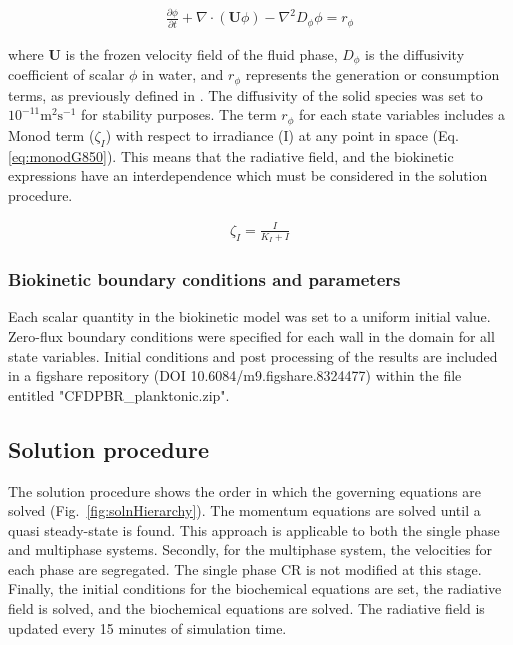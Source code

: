 \begin{align}
\frac{\partial \phi}{\partial t} + \nabla \cdot \left( \mathbf{U}\phi \right) - \nabla^2 D_\phi \phi = r_{\phi}
\end{align}

\noindent where $\mathbf{U}$ is the frozen velocity field of the fluid phase, ${D}_{\phi}$ is the diffusivity coefficient of scalar $\phi$ in water, and $r_{\phi}$ represents the generation or consumption terms, as previously defined in \cite{puyol2017}. The diffusivity of the solid species was set to $10^{-11} \mathrm{m^2 s^{-1}}$ for stability purposes.
\skippingparagraph
The term $r_\phi$ for each state variables includes a Monod term ($\zeta_I$) with respect to irradiance (I) at any point in space (Eq. \eqref{eq:monodG850}). This means that the radiative field, and the biokinetic expressions have an interdependence which must be considered in the solution procedure.

\begin{align}
\label{eq:monodG850}
\zeta_I = \frac{I}{K_I + I}
\end{align}

\subsubsection{Biokinetic boundary conditions and parameters}
Each scalar quantity in the biokinetic model was set to a uniform initial value. Zero-flux boundary conditions were specified for each wall in the domain for all state variables. Initial conditions and post processing of the results are included in a figshare repository (DOI 10.6084/m9.figshare.8324477) within the file entitled "CFDPBR\_planktonic.zip".

\subsection{Solution procedure}
\label{ssec:soln}
The solution procedure shows the order in which the governing equations are solved (Fig.\ \ref{fig:solnHierarchy}). The momentum equations are solved until a quasi steady-state is found. This approach is applicable to both the single phase and multiphase systems. Secondly, for the multiphase system, the velocities for each phase are segregated. The single phase CR is not modified at this stage. Finally, the initial conditions for the biochemical equations are set, the radiative field is solved, and the biochemical equations are solved. The radiative field is updated every 15 minutes of simulation time.

